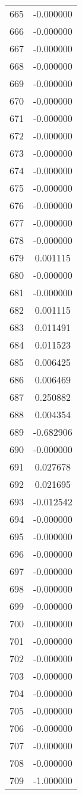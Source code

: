 \documentclass[12pt]{article}
\begin{document}
\begin{longtable}{@{}cc@{}}
665 & -0.000000 \\
666 & -0.000000 \\
667 & -0.000000 \\
668 & -0.000000 \\
669 & -0.000000 \\
670 & -0.000000 \\
671 & -0.000000 \\
672 & -0.000000 \\
673 & -0.000000 \\
674 & -0.000000 \\
675 & -0.000000 \\
676 & -0.000000 \\
677 & -0.000000 \\
678 & -0.000000 \\
679 & 0.001115 \\
680 & -0.000000 \\
681 & -0.000000 \\
682 & 0.001115 \\
683 & 0.011491 \\
684 & 0.011523 \\
685 & 0.006425 \\
686 & 0.006469 \\
687 & 0.250882 \\
688 & 0.004354 \\
689 & -0.682906 \\
690 & -0.000000 \\
691 & 0.027678 \\
692 & 0.021695 \\
693 & -0.012542 \\
694 & -0.000000 \\
695 & -0.000000 \\
696 & -0.000000 \\
697 & -0.000000 \\
698 & -0.000000 \\
699 & -0.000000 \\
700 & -0.000000 \\
701 & -0.000000 \\
702 & -0.000000 \\
703 & -0.000000 \\
704 & -0.000000 \\
705 & -0.000000 \\
706 & -0.000000 \\
707 & -0.000000 \\
708 & -0.000000 \\
709 & -1.000000 \\

\end{longtable}
\end{document}
